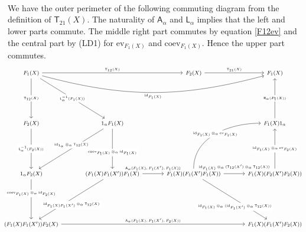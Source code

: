 \begin{prf}
\begin{enumerate}
\begin{equation*}
\begin{tikzcd}[row sep=3.2em,column sep=3.2em]
\end{tikzcd}
\end{equation*}
\newpage
We have the outer perimeter of the following commuting diagram from the definition of $\mathsf{T}_{21}(X)$. The naturality of $\mathsf{A}_{\alpha}$ and $\mathsf{L}_{\alpha}$ implies that the left and lower parts commute. The middle right part commutes by equation \eqref{F12ev} and the central part by (LD1) for $\mathrm{ev}_{F_{1}(X)}$ and $\mathrm{coev}_{F_{1}(X)}$. Hence the upper part commutes.
\begin{equation*}
\hspace{-1em}
\begin{tikzcd}[row sep=6em,column sep=3.2em,font=\footnotesize,every label/.append style={font=\tiny}]
  F_{1}(X)
  \ar{rr}{\mathsf{T}_{12}(X)}
  \ar[bend right=15]{rrr}[swap]{\mathrm{id}_{F_{1}(X)}}
  \ar{rd}[description]{\mathsf{L}_{\alpha}^{-1}(F_{1}(X))}
  \ar{d}[description]{\mathsf{T}_{12}(X)}
  &
  &
  F_{2}(X)
  \ar{r}{\mathsf{T}_{21}(X)}
  &
  F_{1}(X)
  \\
  F_{2}(X)
  \ar{d}[description]{\mathsf{L}_{\alpha}^{-1}(F_{2}(X))}
  &
  1_{\alpha} F_{1}(X)
  \ar{d}[description,yshift=-2mm]{\mathrm{coev}_{F_{1}(X)} \otimes_{\alpha} \mathrm{id}_{F_{1}(X)}}
  \ar{dl}[description,yshift=2mm]{\mathrm{id}_{1_{\alpha}} \otimes_{\alpha} \mathsf{T}_{12}(X)}
  &
  &
  F_{1}(X) 1_{\alpha}
  \ar{u}[description]{\mathsf{R}_{\alpha}(F_{1}(X))}
  \\
  1_{\alpha} F_{2}(X)
  \ar{d}[description,yshift=3mm]{\mathrm{coev}_{F_{1}(X)} \otimes_{\alpha} \mathrm{id}_{F_{2}(X)}}
  &
  (F_{1}(X) F_{1}(X^{\prime})) F_{1}(X)
  \ar{r}[yshift=3pt]{\mathsf{A}_{\alpha}(F_{1}(X),F_{1}(X^{\prime}),F_{1}(X))}
  \ar{dl}[description,yshift=-3mm]{\mathrm{id}_{F_{1}(X) F_{1}(X^{\prime})} \otimes_{\alpha} \mathsf{T}_{12}(X)}
  &
  F_{1}(X) (F_{1}(X^{\prime}) F_{1}(X))
  \ar[in=180,out=90]{ur}[description]{\mathrm{id}_{F_{1}(X)} \otimes_{\alpha} \mathrm{ev}_{F_{1}(X)}}
  \ar{r}[yshift=3pt]{\mathrm{id}_{F_{1}(X)} \otimes_{\alpha} (\mathsf{T}_{12}(X^{\prime}) \otimes_{\alpha} \mathsf{T}_{12}(X))}
  \ar{rd}[description,yshift=-4mm]{\mathrm{id}_{F_{1}(X)} \otimes_{\alpha} (\mathrm{id}_{F_{1}(X^{\prime})} \otimes_{\alpha} \mathsf{T}_{12}(X))}
  &
  F_{1}(X) (F_{2}(X^{\prime}) F_{2}(X))
  \ar{u}[description]{\mathrm{id}_{F_{1}(X)} \otimes_{\alpha} \mathrm{ev}_{F_{2}(X)}}
  \\
  (F_{1}(X) F_{1}(X^{\prime})) F_{2}(X)
  \ar{rrr}{\mathsf{A}_{\alpha}(F_{1}(X),F_{1}(X^{\prime}),F_{2}(X))}
  &
  &
  &
  F_{1}(X) (F_{1}(X^{\prime}) F_{2}(X))

\end{tikzcd}
\end{equation*}
\end{enumerate}
\end{prf}
